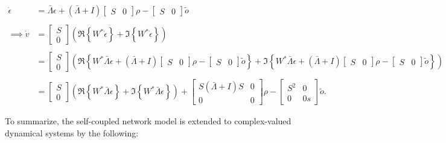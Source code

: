 \begin{align*}
\dot{\epsilon}
&= 
\bar{\Lambda} \epsilon
+
\left( 
\bar{\Lambda} + I
\right)
\begin{bmatrix}
S & 0
\end{bmatrix}
\rho
-
\begin{bmatrix}
S & 0
\end{bmatrix}
\tilde{o}
\\
\\
\implies 
\dot{v} &= \begin{bmatrix}S \\ 0\end{bmatrix} \left( \Re\left\{W^*\dot{\epsilon}\right\} + \Im\left\{W^*\dot{\epsilon}\right\}\right)
\\
\\
&=
\begin{bmatrix}S \\ 0\end{bmatrix} \left( \Re\left\{W^*
\bar{\Lambda} \epsilon
+
\left( 
\bar{\Lambda} + I
\right)
\begin{bmatrix}
S & 0
\end{bmatrix}
\rho
-
\begin{bmatrix}
S & 0
\end{bmatrix}
\tilde{o}
\right\} + \Im\left\{W^*
\bar{\Lambda} \epsilon
+
\left( 
\bar{\Lambda} + I
\right)
\begin{bmatrix}
S & 0
\end{bmatrix}
\rho
-
\begin{bmatrix}
S & 0
\end{bmatrix}
\tilde{o}
\right\}\right)
\\
\\
&=
\begin{bmatrix}
S \\ 0
\end{bmatrix} \left(
\Re\left\{W^*
\bar{\Lambda} \epsilon\right\} + \Im \left\{W^*
\bar{\Lambda} \epsilon\right\}
\right)
+
\begin{bmatrix}
S
\left( 
\bar{\Lambda} + I
\right)
S & 0
\\
0 & 0
\end{bmatrix}
\rho
-
\begin{bmatrix}
S^2 & 0
\\ 0 & 0s
\end{bmatrix}
\tilde{o}.
\end{align*}

To summarize, the self-coupled network model is extended to complex-valued dynamical systems by the following:



